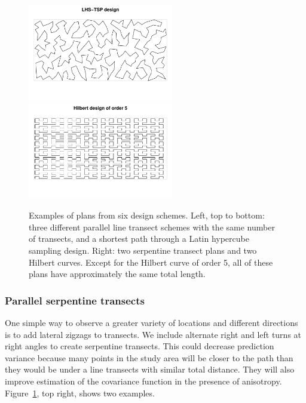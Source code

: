 \documentclass[review]{elsarticle}
\begin{document}
\begin{figure}
\includegraphics[width=2.5in]{LHS-TSP000161.pdf}
\includegraphics[width=2.5in]{Hilbert000237.pdf}

\caption{Examples of plans from six design schemes. Left, top to bottom: three
different parallel line transect schemes with the same number of transects, and
a shortest path through a Latin hypercube sampling design. Right: two
serpentine transect plans and two Hilbert curves. Except for the Hilbert curve
of order 5, all of these plans have approximately the same total length.}
\label{plancomparison}
\end{figure}


\subsubsection{Parallel serpentine transects}

One simple way to observe a greater variety of locations and different
directions is to add lateral zigzags to transects. We include alternate right
and left turns at right angles to create serpentine transects. This could
decrease prediction variance because many points in the study area will be
closer to the path than they would be under a line transects with similar
total distance. They will also improve estimation of the covariance function
in the presence of anisotropy. Figure~\ref{plancomparison}, top right, shows
two examples.

\end{document}
